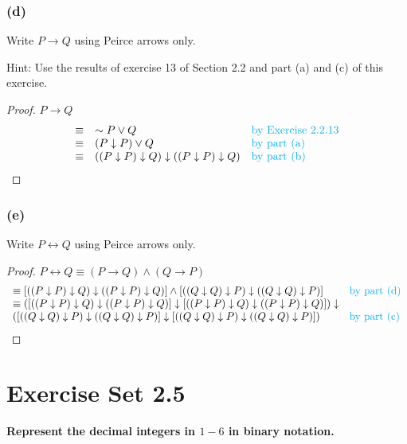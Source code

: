 \documentclass[14pt]{extarticle}
\newcommand{\bic}{\leftrightarrow}
\newcommand{\da}{\downarrow}
\begin{document}
\subsubsection{(d)}
Write $P \to Q$ using Peirce arrows only.

Hint: Use the results of exercise 13 of Section 2.2 and part (a) and (c) of this exercise.

\begin{proof}
    $P \to Q$
    $$
        \begin{array}{cll}
            \equiv & {\sim P} \vee Q  & \text{\color{cyan}by Exercise 2.2.13} \\
            \equiv & (P \da P) \vee Q & \text{\color{cyan}by part (a)}        \\ \equiv & ((P \da P) \da Q) \da ((P \da P) \da Q) & \text{\color{cyan}by part (b)} \\
        \end{array}
    $$
\end{proof}

\subsubsection{(e)}
Write $P \bic Q$ using Peirce arrows only.

\begin{proof}
    $P \bic Q \equiv (P \to Q)\wedge(Q \to P)$
    $$
        \begin{array}{ll}
            \equiv [((P \da P) \da Q) \da ((P \da P) \da Q)] \wedge [((Q \da Q) \da P) \da ((Q \da Q) \da P)]    & \text{\color{cyan}by part (d)} \\
            \equiv ([((P \da P) \da Q) \da ((P \da P) \da Q)] \da [((P \da P) \da Q) \da ((P \da P) \da Q)]) \da &                                \\ ([((Q \da Q) \da P) \da ((Q \da Q) \da P)] \da [((Q \da Q) \da P) \da ((Q \da
            Q) \da P)])                                                                                          & \text{\color{cyan}by part (c)} \\
        \end{array}
    $$
\end{proof}

\section{Exercise Set 2.5}
 {\bf \color{cyan} Represent the decimal integers in $1-6$ in binary notation.}
\end{document}
